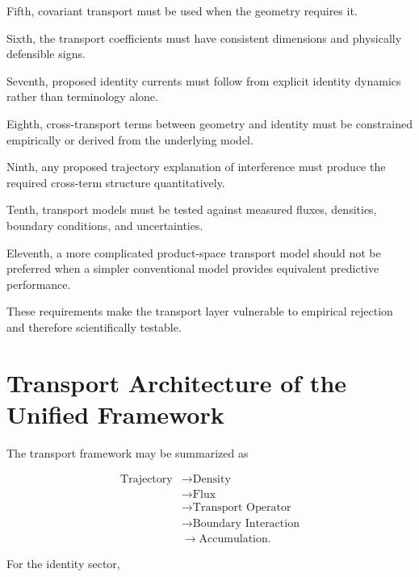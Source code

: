 \documentclass[12pt,oneside]{book}
\begin{document}
Fifth, covariant transport must be used when the geometry
requires it.

Sixth, the transport coefficients must have consistent
dimensions and physically defensible signs.

Seventh, proposed identity currents must follow from explicit
identity dynamics rather than terminology alone.

Eighth, cross-transport terms between geometry and identity must
be constrained empirically or derived from the underlying
model.

Ninth, any proposed trajectory explanation of interference must
produce the required cross-term structure quantitatively.

Tenth, transport models must be tested against measured fluxes,
densities, boundary conditions, and uncertainties.

Eleventh, a more complicated product-space transport model
should not be preferred when a simpler conventional model
provides equivalent predictive performance.

These requirements make the transport layer vulnerable to
empirical rejection and therefore scientifically testable.


\section{Transport Architecture of the Unified Framework}
\label{sec:transport-architecture}

The transport framework may be summarized as

\begin{equation}
\boxed{
\begin{aligned}
    \text{Trajectory}
    &\longrightarrow
    \text{Density}
    \\
    &\longrightarrow
    \text{Flux}
    \\
    &\longrightarrow
    \text{Transport Operator}
    \\
    &\longrightarrow
    \text{Boundary Interaction}
    \\
    &\longrightarrow
    \text{Accumulation}.
\end{aligned}
}
\label{eq:transport-architecture}
\end{equation}

For the identity sector,
\end{document}
